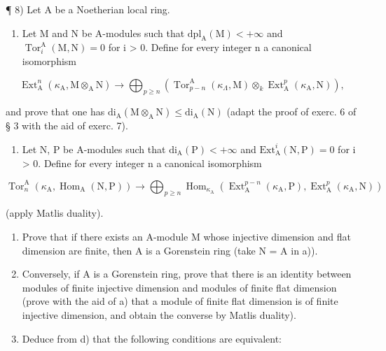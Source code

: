 ¶ 8) Let A be a Noetherian local ring.

\begin{enumerate}
\def\labelenumi{\alph{enumi})}
\tightlist
\item
  Let M and N be A-modules such that \(\mathrm{dpl}_{\mathrm{A}}(\mathrm{M}) < +\infty\) and \(\operatorname{Tor}_{i}^{\mathrm{A}}(\mathrm{M}, \mathrm{N}) = 0\) for i \textgreater{} 0. Define for every integer n a canonical isomorphism
\end{enumerate}

\[
\operatorname{Ext} _ {\mathrm{A}} ^ {n} \left(\kappa_ {\mathrm{A}}, \mathrm{M} \otimes_ {\mathrm{A}} \mathrm{N}\right) \longrightarrow \bigoplus_ {p \geqslant n} \left(\operatorname{Tor} _ {p - n} ^ {\mathrm{A}} \left(\kappa_ {\Lambda}, \mathrm{M}\right) \otimes_ {k} \operatorname{Ext} _ {\mathrm{A}} ^ {p} \left(\kappa_ {\mathrm{A}}, \mathrm{N}\right)\right),
\]

and prove that one has \(\mathrm{di}_{\mathrm{A}}(\mathrm{M}\otimes_{\mathrm{A}}\mathrm{N})\leqslant \mathrm{di}_{\mathrm{A}}(\mathrm{N})\) (adapt the proof of exerc. 6 of § 3 with the aid of exerc. 7).

\begin{enumerate}
\def\labelenumi{\alph{enumi})}
\setcounter{enumi}{1}
\tightlist
\item
  Let N, P be A-modules such that \(\mathrm{di}_{\mathrm{A}}(\mathrm{P}) < +\infty\) and \(\mathrm{Ext}_{\mathrm{A}}^{i}(\mathrm{N},\mathrm{P}) = 0\) for i \textgreater{} 0. Define for every integer n a canonical isomorphism
\end{enumerate}

\[
\operatorname{Tor} _ {n} ^ {\mathrm{A}} \left(\kappa_ {\mathrm{A}}, \operatorname{Hom} _ {\mathrm{A}} (\mathrm{N}, \mathrm{P})\right) \longrightarrow \bigoplus_ {p \geqslant n} \operatorname{Hom} _ {\kappa_ {\mathrm{A}}} \left(\operatorname{Ext} _ {\mathrm{A}} ^ {p - n} \left(\kappa_ {\mathrm{A}}, \mathrm{P}\right), \operatorname{Ext} _ {\mathrm{A}} ^ {p} \left(\kappa_ {\mathrm{A}}, \mathrm{N}\right)\right)
\]

(apply Matlis duality).

\begin{enumerate}
\def\labelenumi{\alph{enumi})}
\setcounter{enumi}{2}
\item
  Prove that if there exists an A-module M whose injective dimension and flat dimension are finite, then A is a Gorenstein ring (take N = A in a)).
\item
  Conversely, if A is a Gorenstein ring, prove that there is an identity between modules of finite injective dimension and modules of finite flat dimension (prove with the aid of a) that a module of finite flat dimension is of finite injective dimension, and obtain the converse by Matlis duality).
\item
  Deduce from d) that the following conditions are equivalent:
\end{enumerate}

